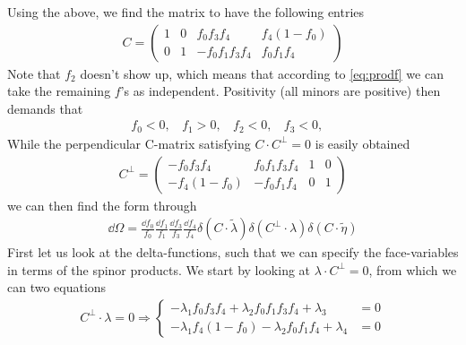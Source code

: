 \documentclass[letter,11pt]{article}
\begin{document}
Using the above, we find the matrix to have the following entries
\begin{equation}
	\begin{aligned}
		C=
		\begin{pmatrix}
			1 & 0 & f_0f_3f_4 & f_4(1-f_0)\\
			0 & 1 & -f_0f_1f_3f_4&f_0f_1f_4
		\end{pmatrix}
	\end{aligned}
\end{equation}
Note that $f_2$ doesn't show up, which means that according to \eqref{eq:prodf} we can take the remaining $f$'s as independent. Positivity (all minors are positive) then demands that
\begin{equation}
	\begin{aligned}
		f_0<0,~~~~f_1>0,~~~~f_2<0,~~~~f_3<0,~~~~
	\end{aligned}
\end{equation}
While the perpendicular C-matrix satisfying $C\cdot C^\perp=0$ is easily obtained
\begin{equation}
	\begin{aligned}
		C^\perp=
		\begin{pmatrix}
		 -f_0f_3f_4 &f_0f_1f_3f_4 & 1 & 0\\
		-f_4(1-f_0) &-f_0f_1f_4 & 0 & 1
		\end{pmatrix}
	\end{aligned}
\end{equation}
we can then find the form through
\begin{equation}
	\begin{aligned}
		\dd \Omega =\frac{\dd f_0}{f_0}\frac{\dd f_1}{f_1}\frac{\dd f_3}{f_3}\frac{\dd f_4}{f_4}\delta(C\cdot \tilde \lambda) \delta(C^\perp\cdot \lambda)\delta(C\cdot \tilde \eta)
	\end{aligned}
\end{equation}
First let us look at the delta-functions, such that we can specify the face-variables in terms of the spinor products. We start by looking at $\lambda \cdot C^\perp=0$, from which we can two equations
\begin{equation}
	\begin{aligned}
		C^\perp\cdot \lambda=0\Rightarrow\begin{cases}
			-\lambda_1f_0f_3f_4+\lambda_2 f_0f_1f_3f_4+ \lambda_3&=0\\
			-\lambda_1f_4(1-f_0)-\lambda_2f_0f_1f_4+ \lambda_4&=0
		\end{cases}
	\end{aligned}
\end{equation}
\end{document}
